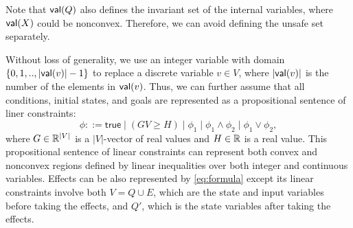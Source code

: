 \documentclass[sigconf]{acmart}
\newcommand{\true}{\mathsf{true}}
\begin{document}
    
    
    

Note that ${\mathsf{val}}(Q)$ also defines the invariant set of the internal variables, where ${\mathsf{val}}(X)$ could be nonconvex. Therefore, we can avoid defining the unsafe set separately.

Without loss of generality, we use an integer variable with domain $\{0,1,..,|{\mathsf{val}}(v)|-1\}$ to replace a discrete variable $v \in V$, where $|{\mathsf{val}}(v)|$ is the number of the elements in ${\mathsf{val}}(v)$. Thus, we can further assume that all conditions, initial states, and goals are represented as a propositional sentence of liner constraints:
\begin{equation}\label{eq:formula}
    \phi ::= \true \mid (GV \geq H) \mid %
  \phi_1 \mid \phi_1 \wedge
  \phi_2 \mid \phi_1 \vee
  \phi_2,
\end{equation} 
where $G \in \mathbb{R}^{|V|}$ is a $|V|$-vector of real values and $H \in \mathbb{R}$ is a real value. This propositional sentence of linear constraints can represent both convex and nonconvex regions defined by linear inequalities over both integer and continuous variables. Effects can be also represented by \eqref{eq:formula} except its linear constraints involve both $V = Q \cup E$, which are the state and input variables before taking the effects, and $Q'$, which is the state variables after taking the effects.
\end{document}
